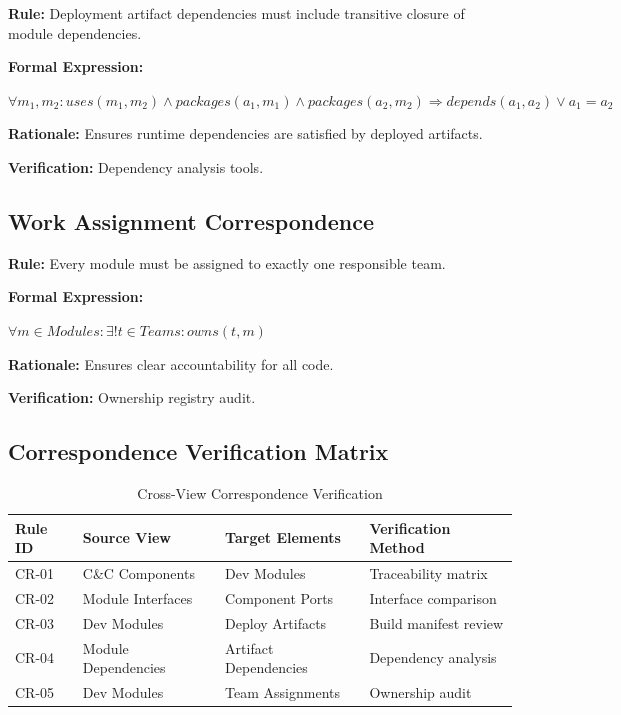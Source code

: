 \documentclass[11pt,letterpaper]{article}
\begin{document}
\begin{definitionbox}
\textbf{Rule:} Deployment artifact dependencies must include transitive closure of module dependencies.

\textbf{Formal Expression:}
\begin{center}
$\forall m_1, m_2 : uses(m_1, m_2) \land packages(a_1, m_1) \land packages(a_2, m_2) \Rightarrow depends(a_1, a_2) \lor a_1 = a_2$
\end{center}

\textbf{Rationale:} Ensures runtime dependencies are satisfied by deployed artifacts.

\textbf{Verification:} Dependency analysis tools.
\end{definitionbox}

\subsection{Work Assignment Correspondence}

\begin{definitionbox}
\textbf{Rule:} Every module must be assigned to exactly one responsible team.

\textbf{Formal Expression:}
\begin{center}
$\forall m \in Modules : \exists! t \in Teams : owns(t, m)$
\end{center}

\textbf{Rationale:} Ensures clear accountability for all code.

\textbf{Verification:} Ownership registry audit.
\end{definitionbox}

\subsection{Correspondence Verification Matrix}

\begin{table}[H]
\centering
\caption{Cross-View Correspondence Verification}
\small
\begin{tabular}{@{}L{2.5cm}L{3.5cm}L{3.5cm}L{3.5cm}@{}}
\toprule
\textbf{Rule ID} & \textbf{Source View} & \textbf{Target Elements} & \textbf{Verification Method} \\
\midrule
CR-01 & C\&C Components & Dev Modules & Traceability matrix \\
CR-02 & Module Interfaces & Component Ports & Interface comparison \\
CR-03 & Dev Modules & Deploy Artifacts & Build manifest review \\
CR-04 & Module Dependencies & Artifact Dependencies & Dependency analysis \\
CR-05 & Dev Modules & Team Assignments & Ownership audit \\
\bottomrule
\end{tabular}
\end{table}
\end{document}
